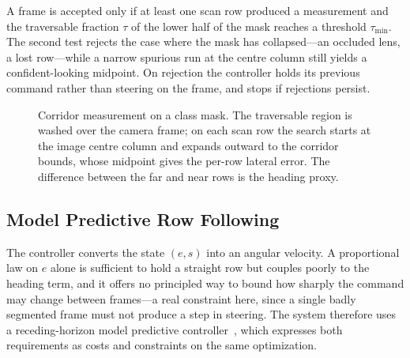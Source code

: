 \documentclass[conference]{IEEEtran}
\begin{document}
A frame is accepted only if at least one scan row produced a measurement and the
traversable fraction $\tau$ of the lower half of the mask reaches a threshold
$\tau_{\min}$. The second test rejects the case where the mask has
collapsed---an occluded lens, a lost row---while a narrow spurious run at the
centre column still yields a confident-looking midpoint. On rejection the
controller holds its previous command rather than steering on the frame, and
stops if rejections persist.

\begin{figure}[t]
\centering
{}
\caption{Corridor measurement on a class mask. The traversable region is washed
over the camera frame; on each scan row the search starts at the image centre
column and expands outward to the corridor bounds, whose midpoint gives the
per-row lateral error. The difference between the far and near rows is the
heading proxy.}
\label{fig:overlay}
\end{figure}

\subsection{Model Predictive Row Following}
\label{sec:mpc}
The controller converts the state $(e,s)$ into an angular velocity. A
proportional law on $e$ alone is sufficient to hold a straight row but couples
poorly to the heading term, and it offers no principled way to bound how sharply
the command may change between frames---a real constraint here, since a single
badly segmented frame must not produce a step in steering. The system therefore
uses a receding-horizon model predictive controller~\cite{ref17}, which
expresses both requirements as costs and constraints on the same optimization.
\end{document}
